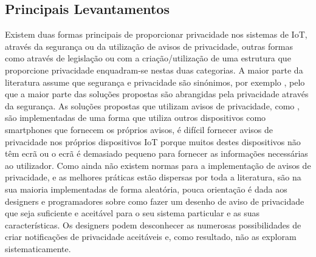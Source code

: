 \documentclass[conference]{IEEEtran}
\begin{document}
\subsection{Principais Levantamentos}

Existem duas formas principais de proporcionar privacidade nos sistemas de
IoT, através da segurança ou da utilização de avisos de privacidade, outras
formas como através de legislação ou com a criação/utilização de uma estrutura
que proporcione privacidade enquadram-se nestas duas categorias. A maior
parte da literatura assume que segurança e privacidade são sinónimos, por
exemplo \cite{opara2022framework, FabianoInternet, SunSecure}, pelo que a
maior parte das soluções propostas são abrangidas pela privacidade através
da segurança. As soluções propostas que utilizam avisos de privacidade,
como \cite{FengDesign}, são implementadas de uma forma que utiliza outros
dispositivos como smartphones que fornecem os próprios avisos, é difícil
fornecer avisos de privacidade nos próprios dispositivos IoT porque muitos
destes dispositivos não têm ecrã ou o ecrã é demasiado pequeno para fornecer
as informações necessárias ao utilizador. Como ainda não existem normas para
a implementação de avisos de privacidade, e as melhores práticas estão dispersas
por toda a literatura, são na sua maioria implementadas de forma aleatória,
pouca orientação é dada aos designers e programadores sobre como fazer um
desenho de aviso de privacidade que seja suficiente e aceitável para o seu
sistema particular e as suas características. Os designers podem desconhecer
as numerosas possibilidades de criar notificações de privacidade aceitáveis e,
como resultado, não as exploram sistematicamente.

\end{document}
